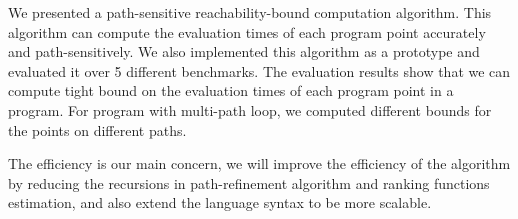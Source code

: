 We presented a path-sensitive reachability-bound computation algorithm.
This algorithm can compute the evaluation times of each program point accurately and path-sensitively.
We also implemented this algorithm as a prototype and evaluated it over 5 different benchmarks.
The evaluation results show that we can compute tight bound on the evaluation times of each program point in a program. For program with multi-path loop, we computed different bounds for the points on different paths.

The efficiency is our main concern, we will improve the efficiency of the algorithm by reducing the recursions in path-refinement algorithm and ranking functions estimation, and also extend the language syntax
to be more scalable.
